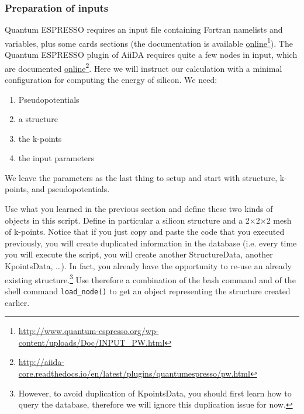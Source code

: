 \subsubsection{Preparation of inputs}
Quantum ESPRESSO requires an input file containing Fortran namelists and variables, plus some cards sections (the documentation is available \href{http://www.quantum-espresso.org/wp-content/uploads/Doc/INPUT_PW.html}{online}\footnote{\url{http://www.quantum-espresso.org/wp-content/uploads/Doc/INPUT_PW.html}}).
The Quantum ESPRESSO plugin of AiiDA requires quite a few nodes in input, which are documented 
\href{http://aiida-core.readthedocs.io/en/latest/plugins/quantumespresso/pw.html}{online}\footnote{\url{http://aiida-core.readthedocs.io/en/latest/plugins/quantumespresso/pw.html}}.
Here we will instruct our calculation with a minimal configuration for computing the energy of silicon. We need:
\begin{enumerate}
\item Pseudopotentials
\item a structure
\item the k-points
\item the input parameters
\end{enumerate}
We leave the parameters as the last thing to setup and start with structure, k-points, and pseudopotentials.

\begin{tcolorbox}
Use what you learned in the previous section and define these two kinds of objects in this script.
Define in particular a silicon structure and a 2$\times$2$\times$2 mesh of k-points.
Notice that if you just copy and paste the code that you executed previously, you will create duplicated information in the database (i.e. every time you will execute the script, you will create another StructureData, another KpointsData, \dots).
In fact, you already have the opportunity to re-use an already existing structure.\footnote{However, to avoid duplication of KpointsData, you should first learn how to query the database, therefore we will ignore this duplication issue for now.}
Use therefore a combination of the bash command  and of the shell command \texttt{load\_node()} to get an object representing the structure created earlier.
\end{tcolorbox}

